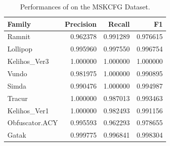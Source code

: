 \begin{table}
    \caption{Performances of \sysname on the MSKCFG Dataset.}
    \begin{center}
        \begin{tabular}{l|rrr}
            \hline
            Family       &  Precision &    Recall &        F1 \\
            \hline
            \hline
            Ramnit       &   0.962378 &  0.991289 &  0.976615 \\
            Lollipop       &   0.995960 &  0.997550 &  0.996754 \\
            Kelihos\_Ver3  &   1.000000 &  1.000000 &  1.000000 \\
            Vundo       &   0.981975 &  1.000000 &  0.990895 \\
            Simda       &   0.990476 &  1.000000 &  0.994987 \\
            Tracur       &   1.000000 &  0.987013 &  0.993463 \\
            Kelihos\_Ver1  &   1.000000 &  0.982493 &  0.991156 \\
            Obfuscator.ACY  &   0.995593 &  0.962293 &  0.978655 \\
            Gatak       &   0.999775 &  0.996841 &  0.998304 \\
            \hline
        \end{tabular}
    \end{center}
    \label{MG:Tab:MSKCFGScores}
\end{table}

